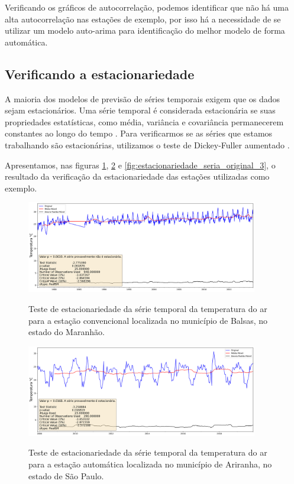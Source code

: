 Verificando os gráficos de autocorrelação, podemos identificar que não há uma alta autocorrelação nas estações de exemplo, por isso há a necessidade de se utilizar um modelo auto-arima para identificação do melhor modelo de forma automática.

\subsection{Verificando a estacionariedade}

A maioria dos modelos de previsão de séries temporais exigem que os dados sejam estacionários. Uma série temporal é considerada estacionária se suas propriedades estatísticas, como média, variância e covariância permanecerem constantes ao longo do tempo \cite{box2011time}. Para verificarmos se as séries que estamos trabalhando são estacionárias, utilizamos o teste de Dickey-Fuller aumentado \cite{said1984testing}. 

Apresentamos, nas figuras  \ref{fig:estacionariedade_seria_original_1}, \ref{fig:estacionariedade_seria_original_2} e \ref{fig:estacionariedade_seria_original_3}, o resultado da verificação da estacionariedade das estações utilizadas como exemplo.

\begin{figure}[H]
    \centering
    \caption{Teste de estacionariedade da série temporal da temperatura do ar para a estação convencional localizada no município de Balsas, no estado do Maranhão.}
    \includegraphics[width=0.9\textwidth]{figuras/dickey_fuller_raw_82768.png}
    \label{fig:estacionariedade_seria_original_1}
\end{figure}

\begin{figure}[H]
    \centering
    \caption{Teste de estacionariedade da série temporal da temperatura do ar para a estação automática localizada no município de Ariranha, no estado de São Paulo.}
    \includegraphics[width=0.9\textwidth]{figuras/dickey_fuller_raw_A736.png}
    \label{fig:estacionariedade_seria_original_2}
\end{figure}

